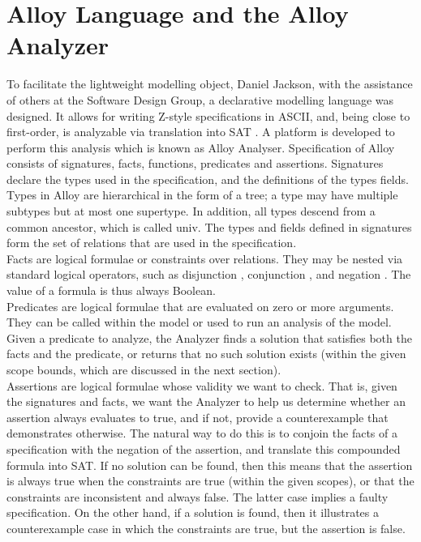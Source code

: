 \documentclass[a4paper,12pt]{extarticle}
\begin{document}
\section{Alloy Language and the Alloy Analyzer}
\label{Alloy and its Analyzer}
To facilitate the lightweight modelling object, Daniel Jackson, with the    assistance of others at the Software Design Group, a declarative modelling language was designed. It allows for writing Z-style specifications in ASCII, and, being close to first-order, is analyzable via translation into SAT . A platform is developed to perform this analysis which is known as Alloy Analyser.
Specification of Alloy consists of signatures, facts, functions, predicates and assertions.
Signatures declare the types used in the specification, and the definitions of the types fields. Types in Alloy are hierarchical in the form of a tree; a type may have multiple subtypes but at most one supertype. In addition, all types descend from a common ancestor, which is called univ. The types and fields defined in signatures form the set of relations that are used in the specification. \\
Facts are logical formulae or constraints over relations. They may be nested via standard logical operators, such as disjunction , conjunction , and negation . The value of a formula is thus always Boolean. \\
Predicates are logical formulae that are evaluated on zero or more arguments. They can be called within the model or used to run an analysis of the model. Given a predicate to analyze, the Analyzer finds a solution that satisfies both the facts and the predicate, or returns that no such solution exists (within the given scope bounds, which are discussed in the next section). \\
Assertions are logical formulae whose validity we want to check. That is, given the signatures and facts, we want the Analyzer to help us determine whether an assertion always evaluates to true, and if not, provide a counterexample that demonstrates otherwise. The natural way to do this is to conjoin the facts of a specification with the negation of the assertion, and translate this compounded formula into SAT. If no solution can be found, then this means that the assertion is always true when the constraints are true (within the given scopes), or that the constraints are inconsistent and always false. The latter case implies a faulty specification. On the other hand, if a solution is found, then it illustrates a counterexample case in which the constraints are true, but the assertion is false.
\end{document}
